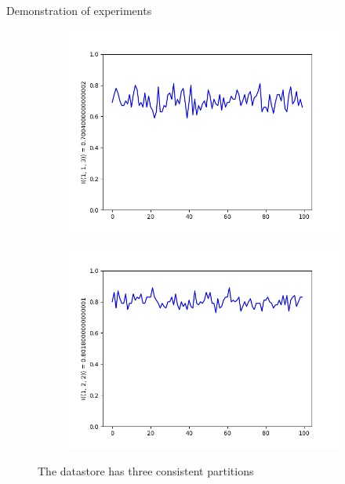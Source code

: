 \documentclass[aspectratio=43]{beamer}
\begin{document}
\begin{frame}{Demonstration of experiments}
\begin{figure}[p]
\begin{subfigure}{0.3\linewidth}
\centering\includegraphics[width=\linewidth]{images/1-1-3-consistent-partitions-probability.png}
\end{subfigure}
\begin{subfigure}{0.3\linewidth}
\centering\includegraphics[width=\linewidth]{images/1-2-2-consistent-partitions-probability.png}
\end{subfigure}
\caption{The datastore has three consistent partitions}
\end{figure}

\end{frame}
\end{document}
